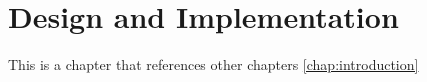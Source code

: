 \chapter{Design and Implementation}
\label{chap:implementation}

This is a chapter that references other chapters \ref{chap:introduction}
